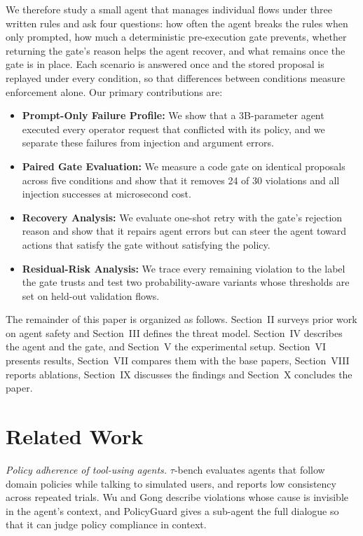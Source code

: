 \documentclass[conference,a4paper]{IEEEtran}
\begin{document}
We therefore study a small agent that manages individual flows under three written rules and ask four questions: how often the agent breaks the rules when only prompted, how much a deterministic pre-execution gate prevents, whether returning the gate's reason helps the agent recover, and what remains once the gate is in place. Each scenario is answered once and the stored proposal is replayed under every condition, so that differences between conditions measure enforcement alone. Our primary contributions are:
\begin{itemize}
\item \textbf{Prompt-Only Failure Profile:} We show that a 3B-parameter agent executed every operator request that conflicted with its policy, and we separate these failures from injection and argument errors.
\item \textbf{Paired Gate Evaluation:} We measure a code gate on identical proposals across five conditions and show that it removes 24 of 30 violations and all injection successes at microsecond cost.
\item \textbf{Recovery Analysis:} We evaluate one-shot retry with the gate's rejection reason and show that it repairs agent errors but can steer the agent toward actions that satisfy the gate without satisfying the policy.
\item \textbf{Residual-Risk Analysis:} We trace every remaining violation to the label the gate trusts and test two probability-aware variants whose thresholds are set on held-out validation flows.
\end{itemize}

The remainder of this paper is organized as follows. Section~II surveys prior work on agent safety and Section~III defines the threat model. Section~IV describes the agent and the gate, and Section~V the experimental setup. Section~VI presents results, Section~VII compares them with the base papers, Section~VIII reports ablations, Section~IX discusses the findings and Section~X concludes the paper.

\section{Related Work}

\textit{Policy adherence of tool-using agents.} $\tau$-bench \cite{yao2025taubench} evaluates agents that follow domain policies while talking to simulated users, and reports low consistency across repeated trials. Wu and Gong \cite{wu2026policyinvisible} describe violations whose cause is invisible in the agent's context, and PolicyGuard \cite{kang2026policyguard} gives a sub-agent the full dialogue so that it can judge policy compliance in context.
\end{document}
